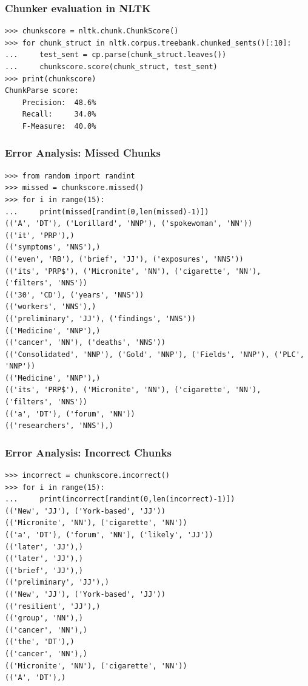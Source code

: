 \begin{frame}[fragile]\frametitle{Chunker evaluation in NLTK}
  \scriptsize

\begin{lstlisting}
>>> chunkscore = nltk.chunk.ChunkScore()
>>> for chunk_struct in nltk.corpus.treebank.chunked_sents()[:10]:
...     test_sent = cp.parse(chunk_struct.leaves())
...     chunkscore.score(chunk_struct, test_sent)
>>> print(chunkscore)
ChunkParse score:
    Precision:  48.6%
    Recall:     34.0%
    F-Measure:  40.0%
\end{lstlisting}
\end{frame}

\begin{frame}[fragile]\frametitle{Error Analysis: Missed Chunks}
  \scriptsize

\begin{lstlisting}
>>> from random import randint
>>> missed = chunkscore.missed()
>>> for i in range(15):
...     print(missed[randint(0,len(missed)-1)])
(('A', 'DT'), ('Lorillard', 'NNP'), ('spokewoman', 'NN'))
(('it', 'PRP'),)
(('symptoms', 'NNS'),)
(('even', 'RB'), ('brief', 'JJ'), ('exposures', 'NNS'))
(('its', 'PRP$'), ('Micronite', 'NN'), ('cigarette', 'NN'), ('filters', 'NNS'))
(('30', 'CD'), ('years', 'NNS'))
(('workers', 'NNS'),)
(('preliminary', 'JJ'), ('findings', 'NNS'))
(('Medicine', 'NNP'),)
(('cancer', 'NN'), ('deaths', 'NNS'))
(('Consolidated', 'NNP'), ('Gold', 'NNP'), ('Fields', 'NNP'), ('PLC', 'NNP'))
(('Medicine', 'NNP'),)
(('its', 'PRP$'), ('Micronite', 'NN'), ('cigarette', 'NN'), ('filters', 'NNS'))
(('a', 'DT'), ('forum', 'NN'))
(('researchers', 'NNS'),)
\end{lstlisting}
\end{frame}

\begin{frame}[fragile]\frametitle{Error Analysis: Incorrect Chunks}
  \scriptsize

\begin{lstlisting}
>>> incorrect = chunkscore.incorrect()
>>> for i in range(15):
...     print(incorrect[randint(0,len(incorrect)-1)])
(('New', 'JJ'), ('York-based', 'JJ'))
(('Micronite', 'NN'), ('cigarette', 'NN'))
(('a', 'DT'), ('forum', 'NN'), ('likely', 'JJ'))
(('later', 'JJ'),)
(('later', 'JJ'),)
(('brief', 'JJ'),)
(('preliminary', 'JJ'),)
(('New', 'JJ'), ('York-based', 'JJ'))
(('resilient', 'JJ'),)
(('group', 'NN'),)
(('cancer', 'NN'),)
(('the', 'DT'),)
(('cancer', 'NN'),)
(('Micronite', 'NN'), ('cigarette', 'NN'))
(('A', 'DT'),)
\end{lstlisting}
\end{frame}

